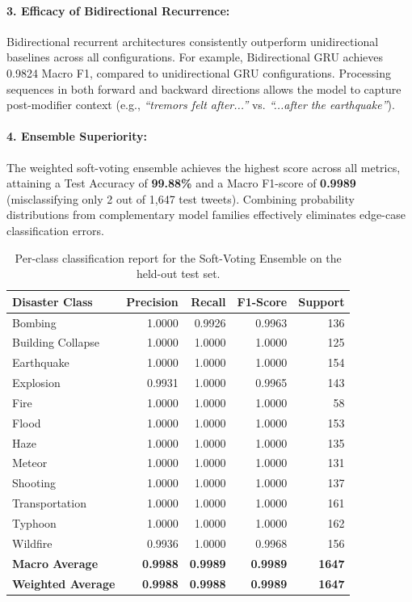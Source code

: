 \documentclass[11pt,a4paper]{article}
\begin{document}
\paragraph{3. Efficacy of Bidirectional Recurrence:}
Bidirectional recurrent architectures consistently outperform unidirectional baselines across all configurations. For example, Bidirectional GRU achieves 0.9824 Macro F1, compared to unidirectional GRU configurations. Processing sequences in both forward and backward directions allows the model to capture post-modifier context (e.g., \textit{``tremors felt after...''} vs. \textit{``...after the earthquake''}).

\paragraph{4. Ensemble Superiority:}
The weighted soft-voting ensemble achieves the highest score across all metrics, attaining a Test Accuracy of \textbf{99.88\%} and a Macro F1-score of \textbf{0.9989} (misclassifying only 2 out of 1,647 test tweets). Combining probability distributions from complementary model families effectively eliminates edge-case classification errors.

\begin{table}[t]
\centering
\small
\begin{tabular}{lrrrr}
\toprule
\textbf{Disaster Class} & \textbf{Precision} & \textbf{Recall} & \textbf{F1-Score} & \textbf{Support} \\
\midrule
Bombing & 1.0000 & 0.9926 & 0.9963 & 136 \\
Building Collapse & 1.0000 & 1.0000 & 1.0000 & 125 \\
Earthquake & 1.0000 & 1.0000 & 1.0000 & 154 \\
Explosion & 0.9931 & 1.0000 & 0.9965 & 143 \\
Fire & 1.0000 & 1.0000 & 1.0000 & 58 \\
Flood & 1.0000 & 1.0000 & 1.0000 & 153 \\
Haze & 1.0000 & 1.0000 & 1.0000 & 135 \\
Meteor & 1.0000 & 1.0000 & 1.0000 & 131 \\
Shooting & 1.0000 & 1.0000 & 1.0000 & 137 \\
Transportation & 1.0000 & 1.0000 & 1.0000 & 161 \\
Typhoon & 1.0000 & 1.0000 & 1.0000 & 162 \\
Wildfire & 0.9936 & 1.0000 & 0.9968 & 156 \\
\midrule
\textbf{Macro Average} & \textbf{0.9988} & \textbf{0.9989} & \textbf{0.9989} & \textbf{1647} \\
\textbf{Weighted Average} & \textbf{0.9988} & \textbf{0.9988} & \textbf{0.9989} & \textbf{1647} \\
\bottomrule
\end{tabular}
\caption{Per-class classification report for the Soft-Voting Ensemble on the held-out test set.}
\label{tab:class_report}
\end{table}
\end{document}
